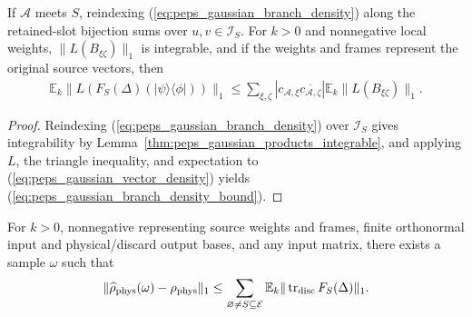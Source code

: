 \begin{lemma}
    \label{thm:peps_gaussian_branch_density_bound}
    \leanok
    If $\mathcal A$ meets $S$, reindexing (\ref{eq:peps_gaussian_branch_density})
    along the retained-slot bijection sums over $u,v\in\mathcal I_S$. For $k>0$
    and nonnegative local weights, $\|L(B_{\xi\zeta})\|_1$ is integrable, and if
    the weights and frames represent the original source vectors, then
    \begin{align}
        \mathbb E_k\|L(F_S(\Delta)(|\psi\rangle\langle\phi|))\|_1
        \leq\sum_{\xi,\zeta}|c_{\mathcal A,\xi}\overline{c_{\mathcal A,\zeta}}|
        \mathbb E_k\|L(B_{\xi\zeta})\|_1.
        \label{eq:peps_gaussian_branch_density_bound}
    \end{align}
\end{lemma}

\begin{proof}\leanok
    Reindexing (\ref{eq:peps_gaussian_branch_density}) over $\mathcal I_S$ gives
    integrability by Lemma~\ref{thm:peps_gaussian_products_integrable}, and
    applying $L$, the triangle inequality, and expectation to
    (\ref{eq:peps_gaussian_vector_density}) yields (\ref{eq:peps_gaussian_branch_density_bound}).
\end{proof}

\begin{lemma}
    \label{thm:peps_sampled_error_integral_bound}
    \leanok
    For $k>0$, nonnegative representing source weights and frames, finite
    orthonormal input and physical/discard output bases, and any input matrix,
    there exists a sample $\omega$ such that
    \begin{align}
        \|\widehat\rho_{\rm phys}(\omega)-\rho_{\rm phys}\|_1
        \leq\sum_{\varnothing\ne S\subseteq\mathcal E}
        \mathbb E_k\|\operatorname{tr}_{\rm disc}F_S(\Delta)\|_1.
        \label{eq:peps_sampled_error_integral_bound}
    \end{align}
\end{lemma}

